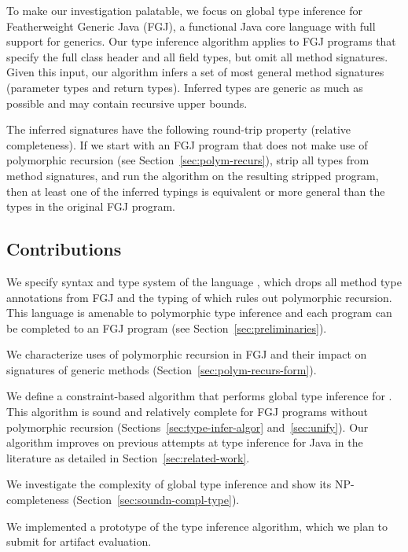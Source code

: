 To make our investigation palatable, we focus on global type inference for Featherweight
Generic Java \cite{DBLP:journals/toplas/IgarashiPW01} (FGJ), a
functional Java core language with full support for generics. Our type inference algorithm
applies to FGJ programs that specify the full class header and all field types,
but omit all method signatures. 
Given this input, our algorithm
infers a set of most general method signatures (parameter types and return types).
Inferred types are generic as much as possible and may contain
recursive upper bounds.

The inferred signatures have the following round-trip property
(relative completeness). If we
start with an FGJ program that does not make use of polymorphic
recursion (see Section~\ref{sec:polym-recurs}), strip all types from
method signatures, and run the algorithm on the 
resulting stripped program, then at least one of the inferred typings is equivalent or more
general than the types in the original FGJ program.






\subsection*{Contributions}
\label{sec:contributions}


We specify syntax and type system of the language \FGJGT, which drops all method type
annotations from FGJ and the typing of which rules out polymorphic
recursion. This language is amenable to polymorphic type inference and
each \FGJGT program can be completed to an FGJ program (see Section~\ref{sec:preliminaries}). 

We characterize uses of polymorphic recursion in FGJ and their impact
on signatures of generic methods (Section~\ref{sec:polym-recurs-form}). 

We define a constraint-based algorithm that performs global type
inference for \FGJGT. This algorithm is sound and relatively complete
for FGJ programs without polymorphic recursion
(Sections~\ref{sec:type-infer-algor} and~\ref{sec:unify}). Our algorithm improves
on previous attempts at type inference for Java in the literature as detailed in
Section~\ref{sec:related-work}. 

We investigate the complexity of global type inference and show its NP-completeness (Section~\ref{sec:soundn-compl-type}).

We implemented a prototype of the type inference algorithm, which we
plan to submit for artifact evaluation.

